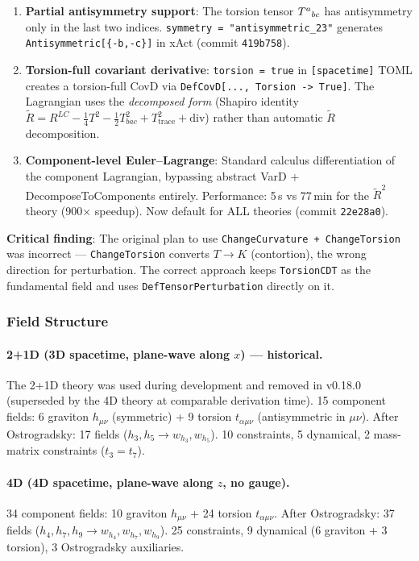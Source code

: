 \begin{enumerate}
  \item \textbf{Partial antisymmetry support}: The torsion tensor $T^a{}_{bc}$ has antisymmetry only in the last two indices. \texttt{symmetry = "antisymmetric\_23"} generates \texttt{Antisymmetric[\{-b,-c\}]} in xAct (commit \texttt{419b758}).

  \item \textbf{Torsion-full covariant derivative}: \texttt{torsion = true} in \texttt{[spacetime]} TOML creates a torsion-full CovD via \texttt{DefCovD[..., Torsion -> True]}. The Lagrangian uses the \emph{decomposed form} (Shapiro identity $\tilde{R} = R^{LC} - \frac{1}{4}T^2 - \frac{1}{2}T^2_{bac} + T^2_\text{trace} + \text{div}$) rather than automatic $\tilde{R}$ decomposition.

  \item \textbf{Component-level Euler--Lagrange}: Standard calculus differentiation of the component Lagrangian, bypassing abstract VarD + DecomposeToComponents entirely. Performance: 5\,s vs 77\,min for the $\tilde{R}^2$ theory (900$\times$ speedup). Now default for ALL theories (commit \texttt{22e28a0}).
\end{enumerate}

\textbf{Critical finding}: The original plan to use \texttt{ChangeCurvature + ChangeTorsion} was incorrect --- \texttt{ChangeTorsion} converts $T \to K$ (contortion), the wrong direction for perturbation. The correct approach keeps \texttt{TorsionCDT} as the fundamental field and uses \texttt{DefTensorPerturbation} directly on it.

\subsubsection{Field Structure}

\paragraph{2+1D (3D spacetime, plane-wave along $x$) --- historical.}
The 2+1D theory was used during development and removed in v0.18.0 (superseded by the 4D theory at comparable derivation time).
15 component fields: 6 graviton $h_{\mu\nu}$ (symmetric) + 9 torsion $t_{\alpha\mu\nu}$ (antisymmetric in $\mu\nu$).
After Ostrogradsky: 17 fields ($h_3, h_5 \to w_{h_3}, w_{h_5}$).  10 constraints, 5 dynamical, 2 mass-matrix constraints ($t_3 = t_7$).

\paragraph{4D (4D spacetime, plane-wave along $z$, no gauge).}
34 component fields: 10 graviton $h_{\mu\nu}$ + 24 torsion $t_{\alpha\mu\nu}$.
After Ostrogradsky: 37 fields ($h_4, h_7, h_9 \to w_{h_4}, w_{h_7}, w_{h_9}$).  25 constraints, 9 dynamical (6 graviton + 3 torsion), 3 Ostrogradsky auxiliaries.

